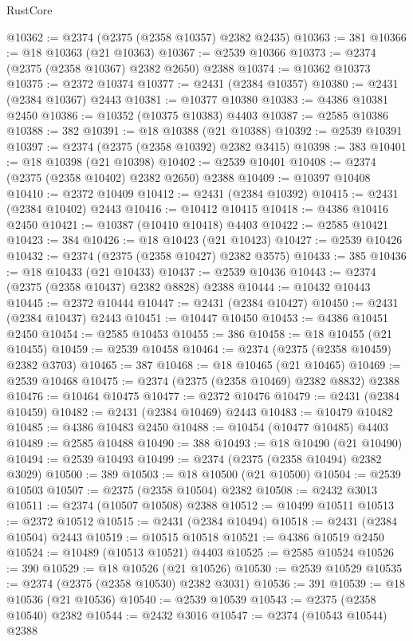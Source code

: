 \begin{lexlean}{RustCore}
\begin{coremodule}
@10362 := @2374 (@2375 (@2358 @10357) @2382 @2435)
@10363 := 381
@10366 := @18 @10363 (@21 @10363)
@10367 := @2539 @10366
@10373 := @2374 (@2375 (@2358 @10367) @2382 @2650) @2388
@10374 := @10362 @10373
@10375 := @2372 @10374
@10377 := @2431 (@2384 @10357)
@10380 := @2431 (@2384 @10367) @2443
@10381 := @10377 @10380
@10383 := @4386 @10381 @2450
@10386 := @10352 (@10375 @10383) @4403
@10387 := @2585 @10386
@10388 := 382
@10391 := @18 @10388 (@21 @10388)
@10392 := @2539 @10391
@10397 := @2374 (@2375 (@2358 @10392) @2382 @3415)
@10398 := 383
@10401 := @18 @10398 (@21 @10398)
@10402 := @2539 @10401
@10408 := @2374 (@2375 (@2358 @10402) @2382 @2650) @2388
@10409 := @10397 @10408
@10410 := @2372 @10409
@10412 := @2431 (@2384 @10392)
@10415 := @2431 (@2384 @10402) @2443
@10416 := @10412 @10415
@10418 := @4386 @10416 @2450
@10421 := @10387 (@10410 @10418) @4403
@10422 := @2585 @10421
@10423 := 384
@10426 := @18 @10423 (@21 @10423)
@10427 := @2539 @10426
@10432 := @2374 (@2375 (@2358 @10427) @2382 @3575)
@10433 := 385
@10436 := @18 @10433 (@21 @10433)
@10437 := @2539 @10436
@10443 := @2374 (@2375 (@2358 @10437) @2382 @8828) @2388
@10444 := @10432 @10443
@10445 := @2372 @10444
@10447 := @2431 (@2384 @10427)
@10450 := @2431 (@2384 @10437) @2443
@10451 := @10447 @10450
@10453 := @4386 @10451 @2450
@10454 := @2585 @10453
@10455 := 386
@10458 := @18 @10455 (@21 @10455)
@10459 := @2539 @10458
@10464 := @2374 (@2375 (@2358 @10459) @2382 @3703)
@10465 := 387
@10468 := @18 @10465 (@21 @10465)
@10469 := @2539 @10468
@10475 := @2374 (@2375 (@2358 @10469) @2382 @8832) @2388
@10476 := @10464 @10475
@10477 := @2372 @10476
@10479 := @2431 (@2384 @10459)
@10482 := @2431 (@2384 @10469) @2443
@10483 := @10479 @10482
@10485 := @4386 @10483 @2450
@10488 := @10454 (@10477 @10485) @4403
@10489 := @2585 @10488
@10490 := 388
@10493 := @18 @10490 (@21 @10490)
@10494 := @2539 @10493
@10499 := @2374 (@2375 (@2358 @10494) @2382 @3029)
@10500 := 389
@10503 := @18 @10500 (@21 @10500)
@10504 := @2539 @10503
@10507 := @2375 (@2358 @10504) @2382
@10508 := @2432 @3013
@10511 := @2374 (@10507 @10508) @2388
@10512 := @10499 @10511
@10513 := @2372 @10512
@10515 := @2431 (@2384 @10494)
@10518 := @2431 (@2384 @10504) @2443
@10519 := @10515 @10518
@10521 := @4386 @10519 @2450
@10524 := @10489 (@10513 @10521) @4403
@10525 := @2585 @10524
@10526 := 390
@10529 := @18 @10526 (@21 @10526)
@10530 := @2539 @10529
@10535 := @2374 (@2375 (@2358 @10530) @2382 @3031)
@10536 := 391
@10539 := @18 @10536 (@21 @10536)
@10540 := @2539 @10539
@10543 := @2375 (@2358 @10540) @2382
@10544 := @2432 @3016
@10547 := @2374 (@10543 @10544) @2388

\end{coremodule}
\end{lexlean}
